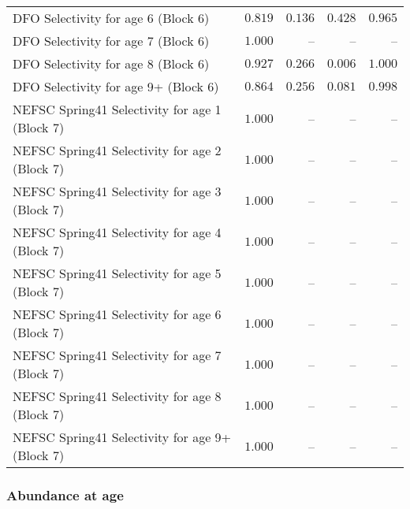 \documentclass[
]{article}
\begin{document}
\begin{landscape}
\begin{longtable}[t]{lrrrr}
DFO Selectivity for age 6 (Block 6) & $0.819$ & $0.136$ & $0.428$ & $0.965$\\
DFO Selectivity for age 7 (Block 6) & $1.000$ & -- & -- & --\\
DFO Selectivity for age 8 (Block 6) & $0.927$ & $0.266$ & $0.006$ & $1.000$\\
\addlinespace
DFO Selectivity for age 9+ (Block 6) & $0.864$ & $0.256$ & $0.081$ & $0.998$\\
NEFSC Spring41 Selectivity for age 1 (Block 7) & $1.000$ & -- & -- & --\\
NEFSC Spring41 Selectivity for age 2 (Block 7) & $1.000$ & -- & -- & --\\
NEFSC Spring41 Selectivity for age 3 (Block 7) & $1.000$ & -- & -- & --\\
NEFSC Spring41 Selectivity for age 4 (Block 7) & $1.000$ & -- & -- & --\\
\addlinespace
NEFSC Spring41 Selectivity for age 5 (Block 7) & $1.000$ & -- & -- & --\\
NEFSC Spring41 Selectivity for age 6 (Block 7) & $1.000$ & -- & -- & --\\
NEFSC Spring41 Selectivity for age 7 (Block 7) & $1.000$ & -- & -- & --\\
NEFSC Spring41 Selectivity for age 8 (Block 7) & $1.000$ & -- & -- & --\\
NEFSC Spring41 Selectivity for age 9+ (Block 7) & $1.000$ & -- & -- & --\\*
\end{longtable}
\end{landscape}

\subsubsection{Abundance at age}\label{abundance-at-age}
\end{document}
